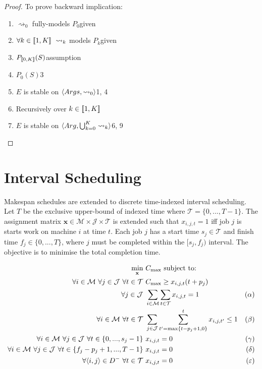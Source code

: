\begin{theorem}
\begin{proof}
		To prove backward implication:
		\begin{enumerate}
			\item$\rightsquigarrow_0$ fully-models $P_0$\hfill given
			\item$\forall k\in\intset{1,K}\ \rightsquigarrow_k$ models $P_k$\hfill given
			\item$P_{[\![{0,K}]\!]}(S)$\hfill assumption
			\item$P_0(S)$\hfill 3
			\item$E$ is stable on $\langle{Args},{\rightsquigarrow_0}\rangle$\hfill 1, 4
			\item Recursively over $k\in[\![{1,K}]\!]$
			\item $E$ is stable on $\langle{Arg},{\bigcup_{k=0}^K\rightsquigarrow_k}\rangle$\hfill 6, 9
		\end{enumerate}
	\end{proof}
\end{theorem}

\section{Interval Scheduling}

Makespan schedules are extended to discrete time-indexed interval scheduling. Let $T$ be the exclusive upper-bound of indexed time where $\mathcal{T}=\{0,...,T-1\}$. The assignment matrix $\mathbf{x}\in\mathcal{M}\times\mathcal{J}\times\mathcal{T}$ is extended such that $x_{i,j,t}=1$ iff job $j$ is starts work on machine $i$ at time $t$. Each job $j$ has a start time $s_j\in\mathcal{T}$ and finish time $f_j\in\{0,...,T\}$, where $j$ must be completed within the $[s_j,f_j)$ interval. The objective is to minimise the total completion time.

\begin{align*}
	\min_{\mathbf{x}}\ &C_{\max}\text{ subject to:}\\
	\forall i\in\mathcal{M}\ \forall j\in\mathcal{J}\ \forall t\in\mathcal{T}\ &C_{\max}\geq x_{i,j,t}(t+p_j)\\
	\forall j\in\mathcal{J}\ &\sum_{i\in\mathcal{M}}\sum_{t\in\mathcal{T}}x_{i,j,t}=1&(\alpha)\\
	\forall i\in\mathcal{M}\ \forall t\in\mathcal{T}\ &\sum_{j\in\mathcal{J}}\sum_{t'=\max\{t-p_j+1,0\}}^t x_{i,j,t'}\leq 1&(\beta)\\
	\forall i\in\mathcal{M}\ \forall j\in\mathcal{J}\ \forall t\in\{0,...,s_j-1\}\ &x_{i,j,t}=0&(\gamma)\\
	\forall i\in\mathcal{M}\ \forall j\in\mathcal{J}\ \forall t\in\{f_j-p_j+1,...,T-1\}\ &x_{i,j,t}=0&(\delta)\\
	\forall\pair{i}{j}\in D^-\ \forall t\in\mathcal{T}\ &x_{i,j,t}=0&(\varepsilon)\\
\end{align*}


